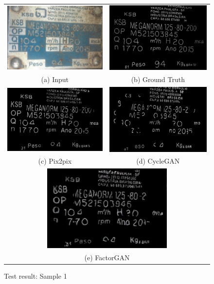 		
\begin{figure}[H]
\begin{tabular}{cc}
\includegraphics[width=65mm]{images/i2.jpg} &   \includegraphics[width=65mm]{images/g2.jpg} \\
(a) Input & (b) Ground Truth \\[6pt]
 \includegraphics[width=65mm]{images/p2.jpg} &   \includegraphics[width=65mm]{images/c2.jpg} \\
(c) Pix2pix & (d) CycleGAN \\[6pt]
\multicolumn{2}{c}{\includegraphics[width=65mm]{images/f2.jpg} }\\
\multicolumn{2}{c}{(e) FactorGAN}
\end{tabular}
\caption{Test result: Sample 1}
\label{test1}
\end{figure}

